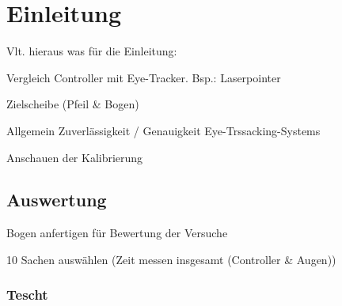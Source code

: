 \chapter{Einleitung}
Vlt. hieraus was für die Einleitung: \cite{Rogers.2019}

Vergleich Controller mit Eye-Tracker. Bsp.: Laserpointer 

Zielscheibe (Pfeil \& Bogen)

Allgemein Zuverlässigkeit / Genauigkeit Eye-Trssacking-Systems

Anschauen der Kalibrierung  

\section{Auswertung}
Bogen anfertigen für Bewertung der Versuche

10 Sachen auswählen (Zeit messen insgesamt (Controller \& Augen))

\subsection{Tescht}